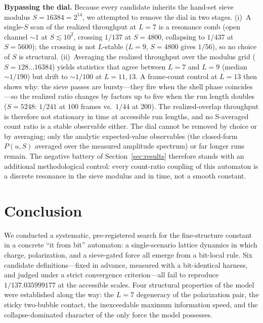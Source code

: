 \documentclass[11pt,a4paper]{article}
\begin{document}
\textbf{Bypassing the dial.} Because every candidate inherits the hand-set
sieve modulus $S=16384=2^{14}$, we attempted to remove the dial in two
stages. (i)~A single-$S$ scan of the realized throughput at $L=7$ is a
resonance comb (open channel $\sim1$ at $S\lesssim10^2$, crossing $1/137$ at
$S=4800$, collapsing to $1/437$ at $S=5600$); the crossing is not
$L$-stable ($L=9$, $S=4800$ gives $1/56$), so no choice of $S$ is
structural. (ii)~Averaging the realized throughput over the modulus grid
($S=128\ldots16384$) yields statistics that agree between $L=7$ and $L=9$
(median $\sim1/190$) but drift to $\sim1/100$ at $L=11,13$. A frame-count
control at $L=13$ then shows why: the sieve passes are bursty---they fire when
the shell phase coincides---so the realized ratio changes by factors up to
five when the run length doubles ($S=5248$: $1/241$ at $100$ frames vs.\
$1/44$ at $200$). The realized-overlap throughput is therefore not
stationary in time at accessible run lengths, and no S-averaged count ratio
is a stable observable either. The dial cannot be removed by choice or by
averaging; only the analytic expected-value observables (the closed-form
$P(u,S)$ averaged over the measured amplitude spectrum) or far longer runs
remain. The negative battery of Section~\ref{sec:results} therefore stands
with an additional methodological control: every count-ratio coupling of
this automaton is a discrete resonance in the sieve modulus and in time, not
a smooth constant.

\section{Conclusion}
\label{sec:conclusion}

We conducted a systematic, pre-registered search for the fine-structure
constant in a concrete ``it from bit'' automaton: a single-scenario lattice
dynamics in which charge, polarization, and a sieve-gated force all emerge
from a bit-local rule. Six candidate definitions---fixed in advance, measured
with a bit-identical harness, and judged under a strict convergence
criterion---all fail to reproduce $1/137.035999177$ at the accessible scales.
Four structural properties of the model were established along the way: the
$L=7$ degeneracy of the polarization pair, the sticky two-bubble contact, the
inexceedable maximum information speed, and the collapse-dominated character
of the only force the model possesses.
\end{document}
